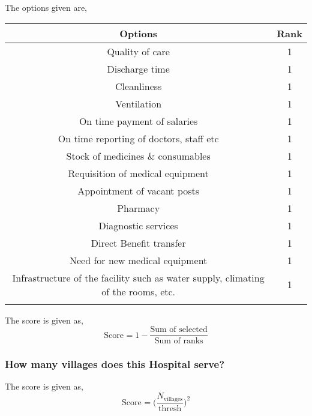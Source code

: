 \documentclass[oneside]{article}
\newcommand{\tsub}[2]{\text{#1}_{\text{#2}}}
\newcommand{\tsubb}[2]{#1_{\text{#2}}}
\newcommand{\dsub}[2]{\dfrac{\text{#1}}{\text{#2}}}
\newenvironment{ttable}
{
\begin{center}
\begin{tabular}{c|c}
\hline
}
{
\\ \hline
\end{tabular}
\end{center}
}
\begin{document}
The options given are,
\begin{ttable}
Options & Rank \\ \hline
Quality of care & 1 \\
Discharge time & 1 \\
Cleanliness & 1 \\
Ventilation & 1 \\
On time payment of salaries & 1 \\
On time reporting of doctors, staff etc & 1 \\
Stock of medicines \& consumables & 1 \\
Requisition of medical equipment & 1 \\
Appointment of vacant posts & 1 \\
Pharmacy & 1 \\
Diagnostic services & 1 \\
Direct Benefit transfer & 1 \\
Need for new medical equipment & 1 \\
Infrastructure of the facility such as water supply, climating of the rooms, etc. & 1 \\
\hline
\end{ttable}
The score is given as,
\[
	\tsub{Score}{} = 1 - \dsub{Sum of selected}{Sum of ranks}
\]
\subsubsection{How many villages does this Hospital serve?}
The score is given as,
\[
	\tsub{Score}{} = \Big(\dfrac{\tsubb{N}{villages}}{\text{thresh}}\Big)^{2}
\]
\end{document}
